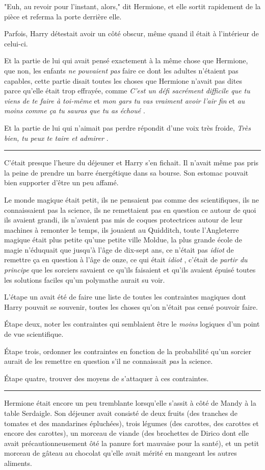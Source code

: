 "Euh, au revoir pour l'instant, alors," dit Hermione, et elle sortit rapidement de la pièce et referma la porte derrière elle.

Parfois, Harry détestait avoir un côté obscur, même quand il était à l'intérieur de celui-ci.

Et la partie de lui qui avait pensé exactement à la même chose que Hermione, que non, les enfants \emph{ne pouvaient pas}  faire ce dont les adultes n'étaient pas capables, cette partie disait toutes les choses que Hermione n'avait pas dites parce qu'elle était trop effrayée, comme \emph{C'est un défi sacrément difficile que tu viens de te faire à toi-même}  et \emph{mon gars tu vas vraiment avoir l'air fin}  et \emph{au moins comme ça tu sauras que tu as échoué} .

Et la partie de lui qui n'aimait pas perdre répondit d'une voix très froide, \emph{Très bien, tu peux te taire et admirer} .
\par\noindent\rule{\textwidth}{0.4pt}
C'était presque l'heure du déjeuner et Harry s'en fichait. Il n'avait même pas pris la peine de prendre un barre énergétique dans sa bourse. Son estomac pouvait bien supporter d'être un peu affamé.

Le monde magique était petit, ils ne pensaient pas comme des scientifiques, ils ne connaissaient pas la science, ils ne remettaient pas en question ce autour de quoi ils avaient grandi, ils n'avaient pas mis de coques protectrices autour de leur machines à remonter le temps, ils jouaient au Quidditch, toute l'Angleterre magique était plus petite qu'une petite ville Moldue, la plus grande école de magie n'éduquait que jusqu'à l'âge de dix-sept ans, ce n'était pas \emph{idiot}  de remettre ça en question à l'âge de onze, ce qui était \emph{idiot} , c'était de \emph{partir du principe}  que les sorciers savaient ce qu'ils faisaient et qu'ils avaient épuisé toutes les solutions faciles qu'un polymathe aurait su voir.

L'étape un avait été de faire une liste de toutes les contraintes magiques dont Harry pouvait se souvenir, toutes les choses qu'on n'était pas censé pouvoir faire.

Étape deux, noter les contraintes qui semblaient être le \emph{moins}  logiques d'un point de vue scientifique.

Étape trois, ordonner les contraintes en fonction de la probabilité qu'un sorcier aurait de les remettre en question s'il ne connaissait \emph{pas}  la science.

Étape quatre, trouver des moyens de s'attaquer à ces contraintes.
\par\noindent\rule{\textwidth}{0.4pt}
Hermione était encore un peu tremblante lorsqu'elle s'assit à côté de Mandy à la table Serdaigle. Son déjeuner avait consisté de deux fruits (des tranches de tomates et des mandarines épluchées), trois légumes (des carottes, des carottes et encore des carottes), un morceau de viande (des brochettes de Dirico dont elle avait précautionneusement ôté la panure fort mauvaise pour la santé), et un petit morceau de gâteau au chocolat qu'elle avait mérité en mangeant les autres aliments.


